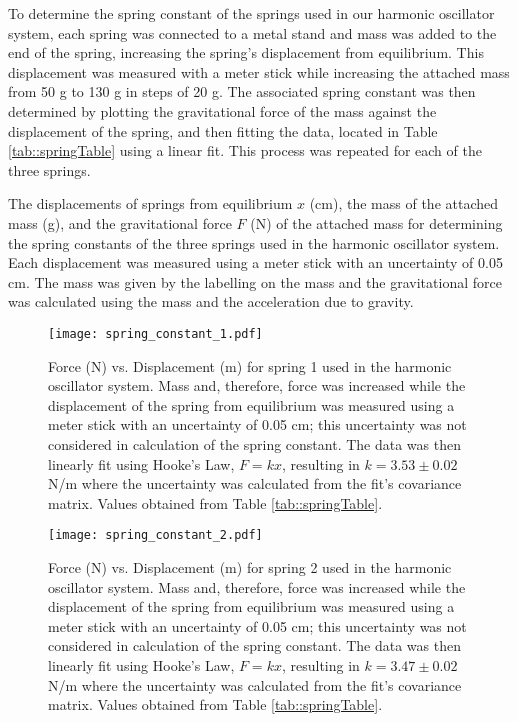 To determine the spring constant of the springs used in our harmonic oscillator system, each spring was connected to a metal stand and mass was added to the end of the spring, increasing the spring's displacement from equilibrium. This displacement was measured with a meter stick while increasing the attached mass from 50 g to 130 g in steps of 20 g. The associated spring constant was then determined by plotting the gravitational force of the mass against the displacement of the spring, and then fitting the data, located in Table \ref{tab::springTable} using a linear fit. This process was repeated for each of the three springs.

\begin{table}[H]
	\centering
	
	\caption{The displacements of springs from equilibrium $x$ (cm), the mass of the attached mass (g), and the gravitational force $F$ (N) of the attached mass for determining the spring constants of the three springs used in the harmonic oscillator system. Each displacement was measured using a meter stick with an uncertainty of 0.05 cm. The mass was given by the labelling on the mass and the gravitational force was calculated using the mass and the acceleration due to gravity.}
	\label{tab::springTable}
\end{table}


\begin{figure}[H]
    \centering
	\texttt{[image: spring\_constant\_1.pdf]}
	\label{fig::spring1}
	\caption{Force (N) vs. Displacement (m) for spring 1 used in the harmonic oscillator system. Mass and, therefore, force was increased while the displacement of the spring from equilibrium was measured using a meter stick with an uncertainty of 0.05 cm; this uncertainty was not considered in calculation of the spring constant. The data was then linearly fit using Hooke's Law, $F = kx$, resulting in $k = 3.53 \pm 0.02$ N/m where the uncertainty was calculated from the fit's covariance matrix. Values obtained from Table \ref{tab::springTable}.}
\end{figure}

\begin{figure}[H]
    \centering
	\texttt{[image: spring\_constant\_2.pdf]}
	\label{fig::spring2}
	\caption{Force (N) vs. Displacement (m) for spring 2 used in the harmonic oscillator system. Mass and, therefore, force was increased while the displacement of the spring from equilibrium was measured using a meter stick with an uncertainty of 0.05 cm; this uncertainty was not considered in calculation of the spring constant. The data was then linearly fit using Hooke's Law, $F = kx$, resulting in $k = 3.47 \pm 0.02$ N/m where the uncertainty was calculated from the fit's covariance matrix. Values obtained from Table \ref{tab::springTable}.}
\end{figure}

